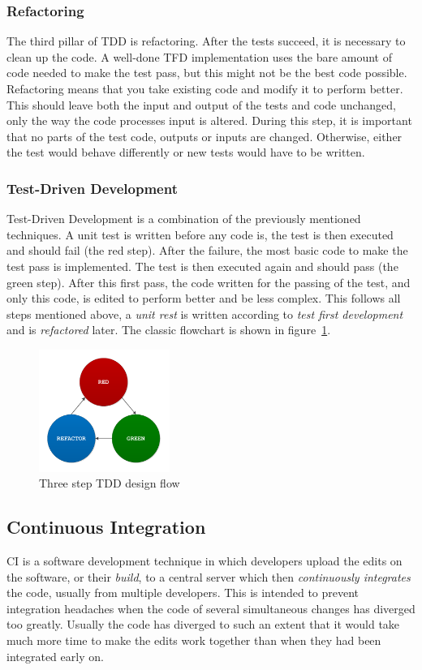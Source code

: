 \documentclass[11pt,british]{article}
\begin{document}
\subsubsection{Refactoring}
The third pillar of TDD is refactoring. After the tests succeed, it is necessary to clean up the code.\cite{refactoring} A well-done \gls{TFD} implementation uses the bare amount of code needed to make the test pass, but this might not be the best code possible. Refactoring means that you take existing code and modify it to perform better. This should leave both the input and output of the tests and code unchanged, only the way the code processes input is altered. During this step, it is important that no parts of the test code, outputs or inputs are changed. Otherwise, either the test would behave differently or new tests would have to be written. 

\subsubsection{Test-Driven Development}
Test-Driven Development is a combination of the previously mentioned techniques. A unit test is written before any code is, the test is then executed and should fail (the red step). After the failure, the most basic code to make the test pass is implemented. The test is then executed again and should pass (the green step). After this first pass, the code written for the passing of the test, and only this code, is edited to perform better and be less complex. This follows all steps mentioned above, a \emph{unit rest} is written according to \emph{test first development} and is \emph{refactored} later. The classic flowchart is shown in figure~\ref{fig:TDD_Flow}.

\begin{figure}[h]
    \centering
	\includegraphics[width=0.38\textwidth]{images/tdd.pdf}
    \caption{Three step TDD design flow}
    \label{fig:TDD_Flow}
\end{figure}

\subsection{Continuous Integration}
\label{subsec:CI}
\gls{CI} is a software development technique in which developers upload the edits on the software, or their \emph{build}, to a central server which then \emph{continuously integrates} the code, usually from multiple developers. This is intended to prevent integration headaches when the code of several simultaneous changes has diverged too greatly. Usually the code has diverged to such an extent that it would take much more time to make the edits work together than when they had been integrated early on.
\end{document}
